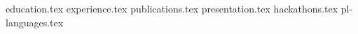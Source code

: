 \documentclass[11pt, a4paper]{awesome-cv}
\newcommand*{\sectiondir}{resume/}
\begin{document}
\makecvheader

{education.tex}
{experience.tex}
{publications.tex}
{presentation.tex}
{hackathons.tex}
{pl-languages.tex}

\end{document}
